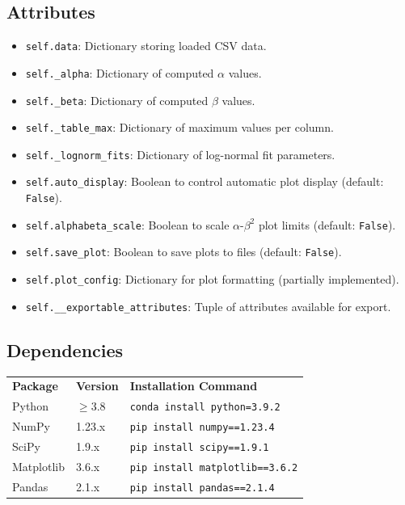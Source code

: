 \documentclass[
	ngerman,							%
	a4paper,							%
	11pt,							%
	oneside							%
	]{article}							%
\begin{document}
\subsection*{Attributes}
\begin{itemize}
    \item \texttt{self.data}: Dictionary storing loaded CSV data.
    \item \texttt{self.\_alpha}: Dictionary of computed $\alpha$ values.
    \item \texttt{self.\_beta}: Dictionary of computed $\beta$ values.
    \item \texttt{self.\_table\_max}: Dictionary of maximum values per column.
    \item \texttt{self.\_lognorm\_fits}: Dictionary of log-normal fit parameters.
    \item \texttt{self.auto\_display}: Boolean to control automatic plot display (default: \texttt{False}).
    \item \texttt{self.alphabeta\_scale}: Boolean to scale $\alpha$-$\beta^2$ plot limits (default: \texttt{False}).
    \item \texttt{self.save\_plot}: Boolean to save plots to files (default: \texttt{False}).
    \item \texttt{self.plot\_config}: Dictionary for plot formatting (partially implemented).
    \item \texttt{self.\_\_exportable\_attributes}: Tuple of attributes available for export.
\end{itemize}
\newpage
\subsection*{Dependencies}
\begin{table}[ht]
\centering
\begin{tabular}{lll}
\textbf{Package} & \textbf{Version} & \textbf{Installation Command} \\
Python & $\geq$3.8 & \texttt{conda install python=3.9.2} \\
NumPy & 1.23.x & \texttt{pip install numpy==1.23.4} \\
SciPy & 1.9.x & \texttt{pip install scipy==1.9.1} \\
Matplotlib & 3.6.x & \texttt{pip install matplotlib==3.6.2} \\
Pandas & 2.1.x & \texttt{pip install pandas==2.1.4} \\
\end{tabular}
\end{table}
\end{document}

